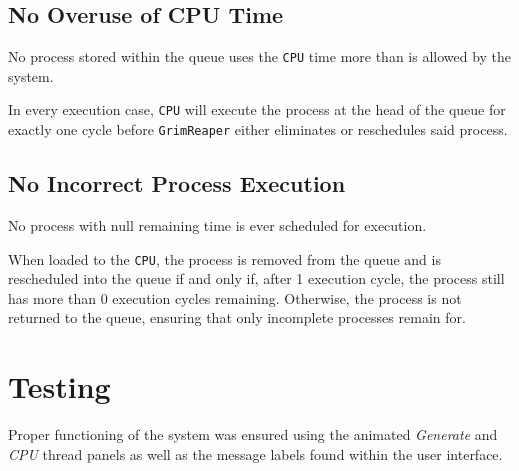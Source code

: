 \documentclass[]{report}
\begin{document}
\vspace{2mm}

\subsection*{No Overuse of CPU Time}
No process stored within the queue uses the \verb|CPU| time more than is allowed by the system. \par 
In every execution case, \verb|CPU| will execute the process at the head of the queue for exactly one cycle before \verb|GrimReaper| either eliminates or reschedules said process. 

\vspace{2mm}

\subsection*{No Incorrect Process Execution}
No process with null remaining time is ever scheduled for execution. \par 
When loaded to the \verb|CPU|, the process is removed from the queue and is rescheduled into the queue if and only if, after 1 execution cycle, the process still has more than 0 execution cycles remaining. Otherwise, the process is not returned to the queue, ensuring that only incomplete processes remain for.

\vspace{2mm}

\section*{Testing}
Proper functioning of the system was ensured using the animated \textit{Generate} and \textit{CPU} thread panels as well as the message labels found within the user interface. 
\end{document}
